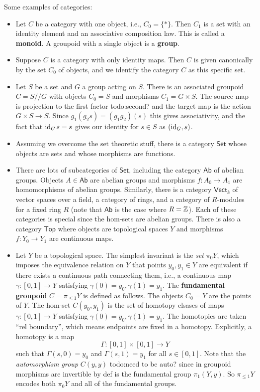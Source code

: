 \begin{example}
    Some examples of categories:
    \begin{itemize}
    \setlength\itemsep{-.2em}
        \item Let $C$ be a category with one object, i.e., $C_0= \{*\} $. Then $C_1$ is a set with an identity element and an associative composition law. This is called a \textbf{monoid}. A groupoid with a single object is a \textbf{group}.
        \item Suppose $C$ is a category with only identity maps. Then $C$ is given canonically by the set $C_0$ of objects, and we identify the category $C$ as this specific set.
        \item Let $S$ be a set and $G$ a group acting on $S$. There is an associated groupoid $C = S // G$ with objects $C_0=S$ and morphisms $C_1=G \times S$. The source map is projection to the first factor {\color{red}todo:second?} and the target map is the action $G \times S \to S$. Since $g_1(g_2 s)=(g_1g_2)(s)$ this gives associativity, and the fact that $\operatorname{id}_Gs=s$ gives our identity for $s \in S$ as $(\operatorname{id}_G,s)$.
         \item Assuming we overcome the set theoretic stuff, there is a category $\mathsf{Set} $ whose objects are sets and whose morphisms are functions.
         \item There are lots of subcategories of $\mathsf{Set} $, including the category $\mathsf{Ab} $ of abelian groups. Objects $A \in \mathsf{Ab} $ are abelian groups and morphisms $f \colon A_0 \to A_1$ are homomorphisms of abelian groups. Similarly, there is a category $\mathsf{Vect} _k$ of vector spaces over a field, a category of rings, and a category of $R$-modules for a fixed ring $R$ (note that $\mathsf{Ab} $ is the case where $R=\mathbb{Z}$). Each of these categories is special since the hom-sets are abelian groups. There is also a category $\mathsf{Top} $ where objects are topological spaces $Y$ and morphisms $f \colon Y_0 \to Y_1$ are continuous maps.
         \item Let $Y$ be a topological space. The simplest invariant is the \emph{set} $\pi_0 Y$, which imposes the equivalence relation on $Y$ that points $y_0,y_1 \in Y$ are equivalent if there exists a continuous path connecting them, i.e., a continuous map $\gamma \colon [0,1] \to Y$ satisfying $\gamma (0)=y_0, \gamma (1)=y_1$. The \textbf{fundamental groupoid} $C=\pi_{\leq 1}Y $ is defined as follows. The objects $C_0=Y$ are the points of $Y$. The hom-set $C(y_0,y_1)$ is the set of homotopy clsases of maps $\gamma \colon [0,1] \to Y$ satisfying $\gamma (0)=y_0, \gamma (1)=y_1$. The homotopies are taken ``rel boundary'', which means endpoints are fixed in a homotopy. Explicitly, a homotopy is a map \[
                 \Gamma \colon [0,1]\times [0,1] \to Y
             \] such that $\Gamma(s,0)=y_0$ and $\Gamma(s,1)=y_1$ for all $s \in [0,1]$. Note that the \emph{automorphism group} $C(y,y)$ {\color{red}todo:need to be auto? since in groupoid morphisms are invertible by def} is the fundamental group $\pi_1(Y,y)$. So $\pi_{\leq 1 }Y$ encodes both $\pi_0Y$ and all of the fundamental groups.
    \end{itemize}
\end{example}
